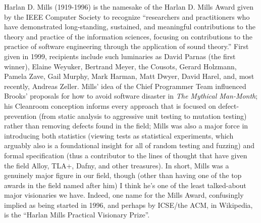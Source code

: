 \documentclass[sigplan,screen]{acmart}
\begin{document}
Harlan D. Mills (1919-1996) is the namesake of the Harlan D. Mills
Award given by the IEEE Computer Society to recognize “researchers and
practitioners who have demonstrated long-standing, sustained, and
meaningful contributions to the theory and practice of the information
sciences, focusing on contributions to the practice of software
engineering through the application of sound theory.”  First given in
1999, recipients include such luminaries as David Parnas (the first
winner), Elaine Weyuker, Bertrand Meyer, the Cousots, Gerard Holzmann,
Pamela Zave, Gail Murphy, Mark Harman, Matt Dwyer, David Harel, and,
most recently, Andreas Zeller.
Mills’ idea of the Chief Programmer Team influenced Brooks’ proposals
for how to avoid software disaster in \emph{The Mythical Man-Month}; his
Cleanroom conception informs every approach that is focused on
defect-prevention (from static analysis to aggressive unit testing to
mutation testing) rather than removing defects found in the field;
Mills was also a major force in introducing both statistics (viewing
tests as statistical experiments, which arguably also is a
foundational insight for all of random testing and fuzzing) and formal
specification (thus a contributor to the lines of thought that have
given the field Alloy, TLA+, Dafny, and other treasures).  In short,
Mills was a genuinely major figure in our field, though (other than having one
of the top awards in the field named after him) I think he’s one of
the least talked-about major visionaries we have. Indeed, one name for the Mills
Award, confusingly implied as being started in 1996, and perhaps by
ICSE/the ACM, in Wikipedia, is the “Harlan Mills Practical Visionary
Prize”.
\end{document}
